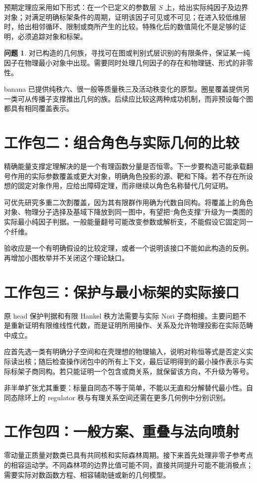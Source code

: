 \documentclass[11pt,a4paper,oneside]{ctexrep}
\theoremstyle{cnplain}
\theoremstyle{definition}
\newtheorem{problem}[theorem]{问题}
\theoremstyle{remark}
\begin{document}
预期定理应采用如下形式：在一个已定义的参数层 $S$ 上，给出实际纯因子及边界对象；对满足明确标架条件的周期，证明该因子可见或不可见；在进入较低维层时，给出相邻循环、限制或商所产生的比较。特殊化后的数值简化不是足够的证明，必须追踪对象和标架。

\begin{problem}
对已构造的几何族，寻找可在图或判别式层识别的有限条件，保证某一纯因子在物理最小对象中出现。需要同时处理几何因子的存在和物理链、形式的非零性。
\end{problem}

banana 已提供纯秩六、很一般等质量秩三及活动秩变化的原型。圈星覆盖提供另一类可从传播子支撑推出几何的族。后续应比较这两种成功机制，而非预设每个图都具有相同覆盖表示。

\section{工作包二：组合角色与实际几何的比较}
精确能量支撑定理解决的是一个有理函数分量是否恒零。下一步要构造可能承载翻号作用的实际参数覆盖或更大对象，明确角色投影的源、靶和下降。若不存在所设想的固定对象作用，应给出障碍定理，而非继续以角色名称替代几何证明。

可优先研究多重二次割覆盖，因为其有限群作用确为代数自同构。将覆盖上的角色对象、物理分子选择及基域下降放到同一图中，有望把``角色支撑''升级为一类图的实际最小纯因子判据。一般能量翻号可能改变参数或解析支，不能假设它固定同一个纤维。

验收应是一个有明确假设的比较定理，或者一个说明该接口不能如此构造的反例。再增加小图枚举并不关闭这个理论缺口。

\section{工作包三：保护与最小标架的实际接口}
原 head 保护判据和有限 Hankel 秩方法需要与实际 Nori 子商相接。主要问题不是重新证明有限维线性代数，而是证明所用操作、关系及允许物理投影在实际范畴中成立。

应首先选一类有明确分子空间和在壳理想的物理输入，说明对称恒等式是否定义实际读出核；随后检查操作闭包中的所有上下文，最后证明得到的最小操作表示与实际标架子商同构。若只能证明一个包含或商关系，就保留该方向，不升级为等号。

非半单扩张尤其重要：标量自同态不等于简单，不能以无直和分解替代最小性。自同态除环上的 regulator 秩与有理关系空间还需在更多几何例中分别识别。

\section{工作包四：一般方案、重叠与法向喷射}
零动量正质量对数类已具有共同核和实际森林周期。接下来首先处理非零子参考点的相容运动学。不同森林项的边界比值可能不同，直接共同提升可能不能消极点；需要实际对数函数方程、相容辅助链或新的几何模型。
\end{document}
